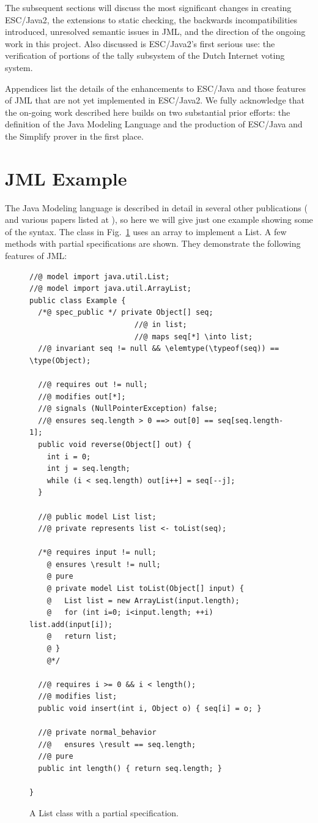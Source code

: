 \documentclass{llncs}
\begin{document}
The subsequent sections will discuss the most significant changes in creating
ESC/Java2, the extensions to static checking, the backwards
incompatibilities introduced, unresolved semantic issues in JML, and
the direction of the ongoing work in this project.  Also discussed is
ESC/Java2's first serious use: the verification of portions of the
tally subsystem of the Dutch Internet voting system.

Appendices list the details of the enhancements to ESC/Java and those
features of JML that are not yet implemented in ESC/Java2.  We fully
acknowledge that the on-going work described here builds on two
substantial prior efforts: the definition of the Java Modeling Language and
the production of ESC/Java and the Simplify prover in the first place.

\section{JML Example}
The Java Modeling language is described in detail in several other
publications (\cite{Leavens-etal00} and various papers listed at
\cite{jmlpapers}), so here we will give just one example showing some
of the syntax.  The class in Fig.~\ref{fig:example} uses an array to
implement a List.  A few methods with partial specifications are
shown.  They demonstrate the following features of JML:
%
\begin{figure}[htbp]
\begin{verbatim}
//@ model import java.util.List;
//@ model import java.util.ArrayList;
public class Example {
  /*@ spec_public */ private Object[] seq;
                        //@ in list;
                        //@ maps seq[*] \into list;
  //@ invariant seq != null && \elemtype(\typeof(seq)) == \type(Object);

  //@ requires out != null;
  //@ modifies out[*];
  //@ signals (NullPointerException) false;
  //@ ensures seq.length > 0 ==> out[0] == seq[seq.length-1];
  public void reverse(Object[] out) {
    int i = 0;
    int j = seq.length;
    while (i < seq.length) out[i++] = seq[--j];
  }

  //@ public model List list;
  //@ private represents list <- toList(seq);

  /*@ requires input != null;
    @ ensures \result != null;
    @ pure
    @ private model List toList(Object[] input) {
    @   List list = new ArrayList(input.length);
    @   for (int i=0; i<input.length; ++i) list.add(input[i]);
    @   return list;
    @ }
    @*/

  //@ requires i >= 0 && i < length();
  //@ modifies list;
  public void insert(int i, Object o) { seq[i] = o; }

  //@ private normal_behavior
  //@   ensures \result == seq.length;
  //@ pure
  public int length() { return seq.length; }

}
\end{verbatim}
\caption{A List class with a partial specification.}
\label{fig:example}
\end{figure}
\end{document}
